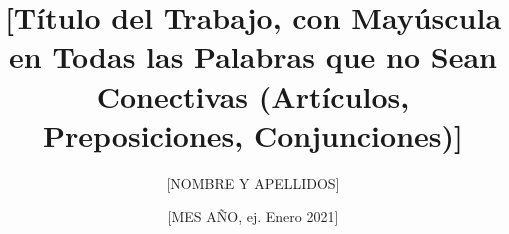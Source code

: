
\newcommand{\Estudios}{[ESTUDIOS, ej. Grado]}

\newcommand{\TituloEstudios}{[TÍTULO DE LOS ESTUDIOS, ej. Ingeniería Informática]}

\newcommand{\Departamento}{[DEPARTAMENTO, ej. Departamento de Lenguajes y Sistemas Informáticos e Ingeniería de Software]}

\newcommand{\NombreAutor}{[NOMBRE Y APELLIDOS]}

\newcommand{\NombreTutor}{[NOMBRE Y APELLIDOS]}

\newcommand{\TituloTFG}{[Título del Trabajo, con Mayúscula en Todas las Palabras que no Sean Conectivas (Artículos, Preposiciones, Conjunciones)]}

\newcommand{\Fecha}{[MES AÑO, ej. Enero 2021]}

\title{\TituloTFG}
\author{\NombreAutor}
\date{\Fecha}

